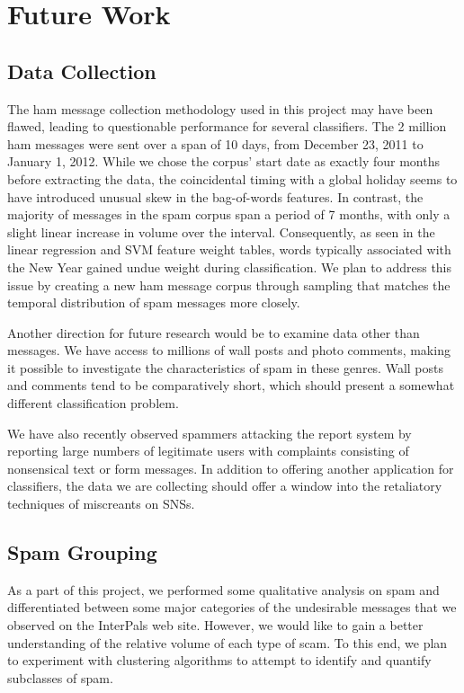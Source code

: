 \documentclass[preprint]{acm_proc_article-sp}
\begin{document}
\section{Future Work}

\subsection{Data Collection}

The ham message collection methodology used in this project may have been flawed, leading to questionable 
performance for several classifiers. The 2 million ham messages were sent over a span of 10 days, from 
December 23, 2011 to January 1, 2012. While we chose the corpus' start date as exactly four months before 
extracting the data, the coincidental timing with a global holiday seems to have introduced unusual 
skew in the bag-of-words features. In contrast, the majority of messages in the spam corpus span a period of 
7 months, with only a slight linear increase in volume over the interval.  Consequently, as seen in 
the linear regression and SVM feature weight tables, words typically associated with the New Year gained 
undue weight during classification.  We plan to address this issue by creating a new ham message corpus 
through sampling that matches the temporal distribution of spam messages more closely.

Another direction for future research would be to examine data other than messages. We have access to millions 
of wall posts and photo comments, making it possible to investigate the characteristics of spam in these genres. 
Wall posts and comments tend to be comparatively short, which should present a somewhat different classification 
problem.

We have also recently observed spammers attacking the report system by reporting large numbers of legitimate users 
with complaints consisting of nonsensical text or form messages. In addition to offering another application for 
classifiers, the data we are collecting should offer a window into the retaliatory techniques of miscreants on 
SNSs.

\subsection{Spam Grouping}

As a part of this project, we performed some qualitative analysis on spam and differentiated between 
some major categories of the undesirable messages that we observed on the InterPals web site. However, we would 
like to gain a better understanding of the relative volume of each type of scam. To this end, we plan to 
experiment with clustering algorithms to attempt to identify and quantify subclasses of spam. 
\end{document}
